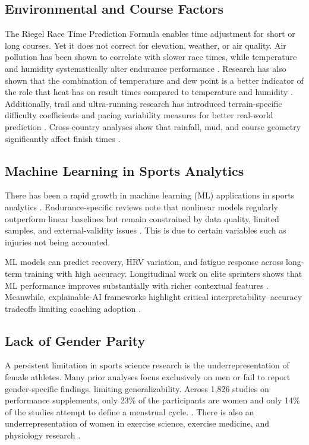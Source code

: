 \documentclass[suppldata]{interact}
\theoremstyle{plain}%
\theoremstyle{definition}
\theoremstyle{remark}
\begin{document}
\subsection{Environmental and Course Factors}
The Riegel Race Time Prediction Formula  \cite{riegel1981athletic} enables time adjustment for short or long courses. Yet it does not correct for elevation, weather, or air quality. Air pollution has been shown to correlate with slower race times, while temperature and humidity systematically alter endurance performance \cite{cusick2023impact}. Research has also shown that the combination of temperature and dew point is a better indicator of the role that heat has on result times compared to temperature and humidity \cite{MaxPerformanceRunning}. Additionally, trail and ultra-running research has introduced terrain-specific difficulty coefficients and pacing variability measures for better real-world prediction \cite{gutierrez2025real}. Cross-country analyses show that rainfall, mud, and course geometry significantly affect finish times \cite{wilson2024assessing}.

\subsection{Machine Learning in Sports Analytics}
There has been a rapid growth in machine learning (ML) applications in sports analytics \cite{pietraszewski2025role}. Endurance-specific reviews note that nonlinear models regularly outperform linear baselines but remain constrained by data quality, limited samples, and external-validity issues \cite{rajvsp2025role}. This is due to certain variables such as injuries not being accounted.

ML models can predict recovery, HRV variation, and fatigue response across long-term training with high accuracy\cite{rothschild2024predicting}. Longitudinal work on elite sprinters shows that ML performance improves substantially with richer contextual features \cite{bartosz2025longitudinal}. Meanwhile, explainable-AI frameworks highlight critical interpretability–accuracy tradeoffs limiting coaching adoption \cite{kranzinger2025scoping}.

\subsection{Lack of Gender Parity}
A persistent limitation in sports science research is the underrepresentation of female athletes. Many prior analyses focus exclusively on men or fail to report gender-specific findings, limiting generalizability. Across 1,826 studies on performance supplements, only 23\% of the participants are women and only 14\% of the studies attempt to define a menstrual cycle.
\cite{james2023underrepresentation}. There is also an underrepresentation of women in exercise science, exercise medicine, and physiology research \cite{anderson2023under, smith2022auditing}. 
\end{document}

